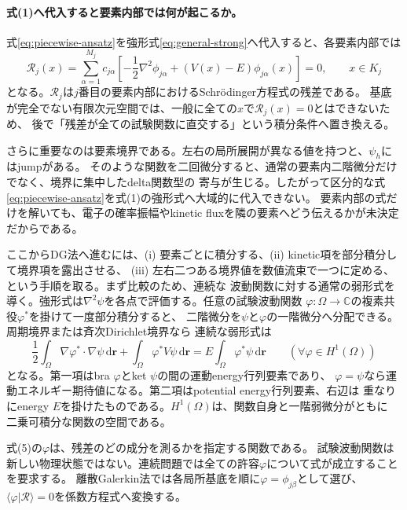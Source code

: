 \documentclass[11pt,a4paper]{article}
\newcommand{\dd}{\mathrm d}
\newcommand{\laplacian}{\nabla^2}
\begin{document}
\paragraph{式(1)へ代入すると要素内部では何が起こるか。}
式\eqref{eq:piecewise-ansatz}を強形式\eqref{eq:general-strong}へ代入すると、各要素内部では
\begin{equation}
 \mathcal R_j(x)
 =\sum_{\alpha=1}^{M_j}c_{j\alpha}
 \left[-\frac12\laplacian\phi_{j\alpha}
 +(V(x)-E)\phi_{j\alpha}(x)\right]=0,
 \qquad x\in K_j
 \label{eq:element-strong-residual}
\end{equation}
となる。$\mathcal R_j$は$j$番目の要素内部におけるSchr\"odinger方程式の残差である。
基底が完全でない有限次元空間では、一般に全ての$x$で$\mathcal R_j(x)=0$とはできないため、
後で「残差が全ての試験関数に直交する」という積分条件へ置き換える。

さらに重要なのは要素境界である。左右の局所展開が異なる値を持つと、$\psi_h$にはjumpがある。
そのような関数を二回微分すると、通常の要素内二階微分だけでなく、境界に集中したdelta関数型の
寄与が生じる。したがって区分的な式\eqref{eq:piecewise-ansatz}を式(1)の強形式へ大域的に代入できない。
要素内部の式だけを解いても、電子の確率振幅やkinetic fluxを隣の要素へどう伝えるかが未決定だからである。

ここからDG法へ進むには、(i) 要素ごとに積分する、(ii) kinetic項を部分積分して境界項を露出させる、
(iii) 左右二つある境界値を数値流束で一つに定める、という手順を取る。まず比較のため、連続な
波動関数に対する通常の弱形式を導く。強形式は$\laplacian\psi$を各点で評価する。任意の試験波動関数
$\varphi:\Omega\to\mathbb C$の複素共役$\varphi^*$を掛けて一度部分積分すると、
二階微分を$\psi$と$\varphi$の一階微分へ分配できる。周期境界または斉次Dirichlet境界なら
連続な弱形式は
\begin{equation}
 \frac12\int_\Omega\nabla \varphi^*\cdot\nabla \psi\,\dd\boldsymbol r
 +\int_\Omega \varphi^*V\psi\,\dd\boldsymbol r
 =E\int_\Omega \varphi^*\psi\,\dd\boldsymbol r
 \qquad(\forall \varphi\in H^1(\Omega))
 \label{eq:continuous-weak-first}
\end{equation}
となる。第一項はbra $\varphi$とket $\psi$の間の運動energy行列要素であり、
$\varphi=\psi$なら運動エネルギー期待値になる。第二項はpotential energy行列要素、右辺は
重なりにenergy $E$を掛けたものである。$H^1(\Omega)$は、関数自身と一階弱微分がともに
二乗可積分な関数の空間である。

式(5)の$\varphi$は、残差のどの成分を測るかを指定する関数である。
試験波動関数は新しい物理状態ではない。連続問題では全ての許容$\varphi$について式が成立することを要求する。
離散Galerkin法では各局所基底を順に$\varphi=\phi_{j\beta}$として選び、
$\langle\varphi|\mathcal R\rangle=0$を係数方程式へ変換する。
\end{document}
